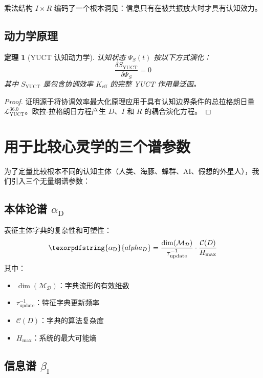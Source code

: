 \documentclass[11pt,a4paper]{article}
\newtheorem{theorem}{定理}
\DeclareRobustCommand{\alD}{\texorpdfstring{\ensuremath{\alpha_{\mathrm{D}}}}{alpha_D}}
\DeclareRobustCommand{\beI}{\texorpdfstring{\ensuremath{\beta_{\mathrm{I}}}}{beta_I}}
\newcommand{\eff}{\mathrm{eff}}
\newcommand{\Dict}{\mathcal{D}}
\newcommand{\Mdict}{\mathcal{M}_{\Dict}}
\newcommand{\Ke}{K_{\eff}}
\begin{document}
	乘法结构 \(I \times R\) 编码了一个根本洞见：信息只有在被共振放大时才具有认知效力。
	
	\subsection{动力学原理}
	
	\begin{theorem}[YUCT 认知动力学]
		认知状态 \(\Psi_S(t)\) 按以下方式演化：
		\begin{equation}
			\label{eq:cognitive-dynamics}
			\frac{\delta S_{\mathrm{YUCT}}}{\delta \Psi_S} = 0
		\end{equation}
		其中 \(S_{\mathrm{YUCT}}\) 是包含协调效率 \(\Ke\) 的完整 YUCT 作用量泛函。
	\end{theorem}
	
	\begin{proof}
		证明源于将协调效率最大化原理应用于具有认知边界条件的总拉格朗日量 \(\mathcal{L}_{\mathrm{YUCT}}^{36.0}\)。欧拉-拉格朗日方程产生 \(D\)、\(I\) 和 \(R\) 的耦合演化方程。
	\end{proof}
	
	\section{用于比较心灵学的三个谱参数}
	
	为了定量比较根本不同的认知主体（人类、海豚、蜂群、AI、假想的外星人），我们引入三个无量纲谱参数：
	
	\subsection{本体论谱 \alD}
	
	表征主体字典的复杂性和可塑性：
	\begin{equation}
		\label{eq:alphaD}
		\alD = \frac{\dim(\Mdict)}{\tau_{\mathrm{update}}^{-1}} \cdot \frac{\mathcal{C}(D)}{H_{\mathrm{max}}}
	\end{equation}
	其中：
	\begin{itemize}
		\item \(\dim(\Mdict)\)：字典流形的有效维数
		\item \(\tau_{\mathrm{update}}^{-1}\)：特征字典更新频率
		\item \(\mathcal{C}(D)\)：字典的算法复杂度
		\item \(H_{\mathrm{max}}\)：系统的最大可能熵
	\end{itemize}
	
	\subsection{信息谱 \beI}
	
\end{document}
